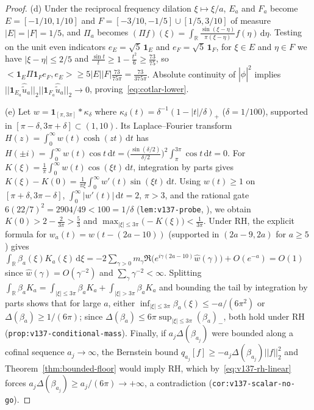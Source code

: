 \documentclass[11pt]{article}
\def\norm#1{||#1||}%
\def\ip#1#2{<#1,#2>}%
\theoremstyle{remark}
\newcommand{\norm}[1]{\left\lVert #1\right\rVert}
\newcommand{\ip}[2]{\left\langle #1,#2\right\rangle}
\newcommand{\dd}{\mathrm d}
\begin{document}
\begin{proof}
(d) Under the reciprocal frequency dilation $\xi \mapsto \xi/a$, $E_a$ and $F_a$ become $E = [-1/10, 1/10]$ and $F = [-3/10, -1/5] \cup [1/5, 3/10]$ of measure $|E| = |F| = 1/5$, and $\Pi_a$ becomes $(\Pi f)(\xi) = \int_{\mathbb{R}} \frac{\sin(\xi - \eta)}{\pi(\xi - \eta)}f(\eta)\,\dd\eta$. Testing on the unit even indicators $e_E = \sqrt{5}\,\mathbf{1}_E$ and $e_F = \sqrt{5}\,\mathbf{1}_F$, for $\xi \in E$ and $\eta \in F$ we have $|\xi - \eta| \le 2/5$ and $\frac{\sin t}{t} \ge 1 - \frac{t^2}{6} \ge \frac{73}{75}$, so $\ip{\mathbf{1}_E \Pi \mathbf{1}_F e_F}{e_E} \ge 5|E||F|\frac{73}{75\pi} = \frac{73}{375\pi}$. Absolute continuity of $|\widehat{\phi}|^2$ implies $\norm{\mathbf{1}_{E_a}\widehat{\widetilde{u}}_a}_2 \norm{\mathbf{1}_{F_a}\widehat{\widetilde{u}}_a}_2 \to 0$, proving~\eqref{eq:cotlar-lower}.

(e) Let $w = \mathbf{1}_{[\pi, 3\pi]} * \kappa_\delta$ where $\kappa_\delta(t) = \delta^{-1}(1 - |t|/\delta)_+$ ($\delta = 1/100$), supported in $[\pi - \delta, 3\pi + \delta] \subset (1, 10)$. Its Laplace--Fourier transform $H(z) = \int_0^\infty w(t)\cosh(zt)\,\dd t$ has $H(\pm i) = \int_0^\infty w(t)\cos t\,\dd t = \bigl(\frac{\sin(\delta/2)}{\delta/2}\bigr)^2\int_\pi^{3\pi}\cos t\,\dd t = 0$. For $K(\xi) = \frac{1}{\pi}\int_0^\infty w(t)\cos(\xi t)\,\dd t$, integration by parts gives $K(\xi) - K(0) = \frac{1}{\pi\xi}\int_0^\infty w'(t)\sin(\xi t)\,\dd t$. Using $w(t) \ge 1$ on $[\pi+\delta, 3\pi-\delta]$, $\int_0^\infty |w'(t)|\,\dd t = 2$, $\pi > 3$, and the rational gate $6(22/7)^2 = 2904/49 < 100 = 1/\delta$ (\texttt{lem:v137-probe}, ), we obtain $K(0) > 2 - \frac{2}{3\pi} > \frac{5}{3}$ and $\max_{|\xi|\le 3\pi}\bigl(-K(\xi)\bigr) < \frac{1}{3\pi}$. Under RH, the explicit formula for $w_a(t) = w(t - (2a - 10))$ (supported in $(2a-9, 2a)$ for $a \ge 5$) gives $\int_{\mathbb{R}} \beta_a(\xi)K_a(\xi)\,\dd\xi = -2\sum_{\gamma > 0} m_\gamma \Re\bigl(e^{i\gamma(2a-10)}\widehat{w}(\gamma)\bigr) + O(e^{-a}) = O(1)$ since $\widehat{w}(\gamma) = O(\gamma^{-2})$ and $\sum_\gamma \gamma^{-2} < \infty$. Splitting $\int_{\mathbb{R}} \beta_a K_a = \int_{|\xi|\le 3\pi} \beta_a K_a + \int_{|\xi|>3\pi} \beta_a K_a$ and bounding the tail by integration by parts shows that for large $a$, either $\inf_{|\xi|\le 3\pi}\beta_a(\xi) \le -a/(6\pi^2)$ or $\Delta(\beta_a) \ge 1/(6\pi)$; since $\Delta(\beta_a) \le 6\pi\sup_{|\xi|\le 3\pi}(\beta_a)_-$, both hold under RH (\texttt{prop:v137-conditional-mass}). Finally, if $a_j\Delta(\beta_{a_j})$ were bounded along a cofinal sequence $a_j \to \infty$, the Bernstein bound $q_{a_j}[f] \ge -a_j\Delta(\beta_{a_j})\norm{f}_2^2$ and Theorem~\ref{thm:bounded-floor} would imply RH, which by~\eqref{eq:v137-rh-linear} forces $a_j\Delta(\beta_{a_j}) \ge a_j/(6\pi) \to +\infty$, a contradiction (\texttt{cor:v137-scalar-no-go}).


\end{proof}
\end{document}
